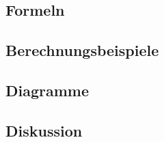 \documentclass[12pt,a4paper,ngerman]{article}
\begin{document}
\subsection{Formeln}

\subsection{Berechnungsbeispiele}

\subsection{Diagramme}

\subsection{Diskussion}


 



   
\end{document}
